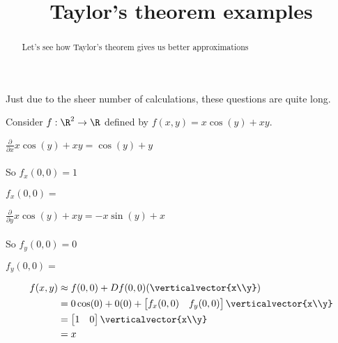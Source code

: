 \documentclass{ximera}
\title{Taylor's theorem examples}
\begin{document}
	\begin{abstract}
		Let's see how Taylor's theorem gives us better approximations
	\end{abstract}
	
	\begin{warning}
		Just due to the sheer number of calculations, these questions are quite long.
	\end{warning}
	
	\begin{question}
		Consider $f:\R^2 \to \R$ defined by $f(x,y) = x\cos(y)+xy$.
		\begin{solution}
			\begin{hint}
				\begin{question}
					\begin{solution}
						\begin{hint}
							$\frac{\partial}{\partial x} x\cos(y)+xy= \cos(y)+y$
							\\
							\\
							So $f_x(0,0) = 1$
						\end{hint}
					$f_x(0,0) = $
					\end{solution}
					\begin{solution}
						\begin{hint}
							$\frac{\partial }{\partial y} x\cos(y)+xy = -x\sin(y)+x$
							\\
							\\
							So $f_y(0,0) = 0$
						\end{hint}
					$f_y(0,0) = $\answer{0}
					\end{solution}
				\end{question}
			\end{hint}
			\begin{hint}
				\begin{align*}
					f(x,y) &\approx f(0,0)+ Df(0,0)(\verticalvector{x\\y})\\
						&=0\cos(0)+0(0)+\begin{bmatrix} f_x(0,0)  & f_y(0,0) \end{bmatrix}\verticalvector{x\\y}\\
						&= \begin{bmatrix} 1 & 0 \end{bmatrix}\verticalvector{x\\y}\\
						&= x
				\end{align*}
			\end{hint}

\end{solution}
\end{question}
\end{document}
